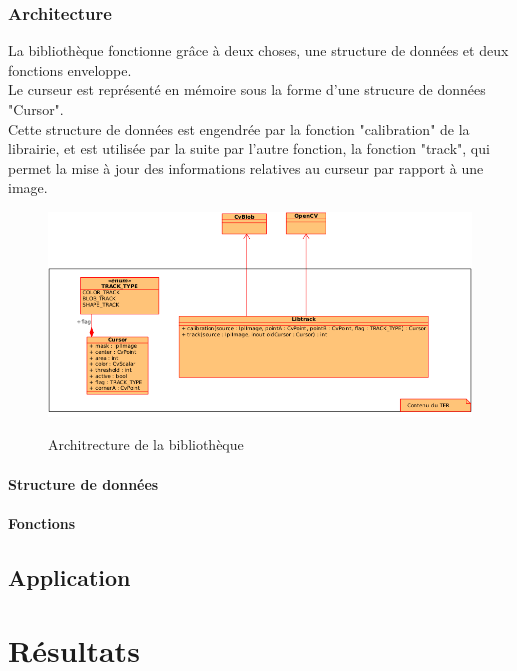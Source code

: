 \documentclass{report}
\begin{document}
			\subsection{Architecture}
					La bibliothèque fonctionne grâce à deux choses, une structure de données et deux fonctions enveloppe. \\
					Le curseur est représenté en mémoire sous la forme d'une strucure de données "Cursor". \\
					Cette structure de données est engendrée par la fonction "calibration" de la librairie, et est utilisée par la suite par l'autre fonction, la fonction "track", qui permet la mise à jour des informations relatives au curseur par rapport à une image.
					\begin{figure}[!h]
						\centering
						\includegraphics[scale=0.8]{../soutenance/libtrack-uml.png}\\
						\caption{Architrecture de la bibliothèque}
						\label{Architrecture de la bibliothèque}
					\end{figure}
				\newpage
				\subsubsection{Structure de données}
				\subsubsection{Fonctions}
			\subsection{}
		\section{Application}
	
	\chapter{Résultats}
\end{document}
